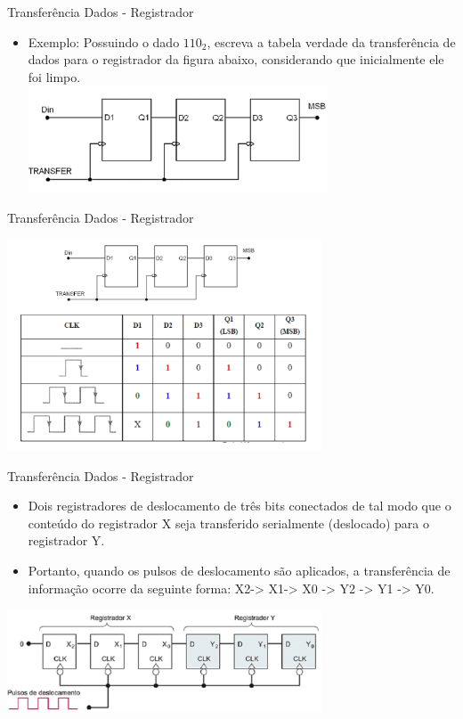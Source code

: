 \documentclass{beamer}
\begin{document}
\begin{frame}{Transferência Dados - Registrador }
\begin{itemize}
    \item Exemplo: 
Possuindo o dado $110_{2}$, escreva a tabela verdade da transferência de dados para o registrador da figura abaixo, considerando que inicialmente ele foi limpo.\\
 
\centering
\includegraphics[width=0.7\textwidth]{figures/transf_d3bits.png}

\end{itemize}
\end{frame}


\begin{frame}{Transferência Dados - Registrador }
 
\centering
\includegraphics[width=0.7\textwidth]{figures/tabela_deslocador_ff_d.png}

\end{frame}


\begin{frame}{Transferência Dados - Registrador }
\begin{itemize}
    \item Dois registradores de deslocamento de três bits conectados de tal modo que o conteúdo do registrador X seja transferido serialmente (deslocado) para o registrador Y. 

\item Portanto, quando os pulsos de deslocamento são aplicados, a transferência de informação ocorre da seguinte forma: X2-> X1-> X0 -> Y2 -> Y1 -> Y0. 

\end{itemize}
 
\centering
\includegraphics[width=0.7\textwidth]{figures/des_3valores.png}

\end{frame}
\end{document}
